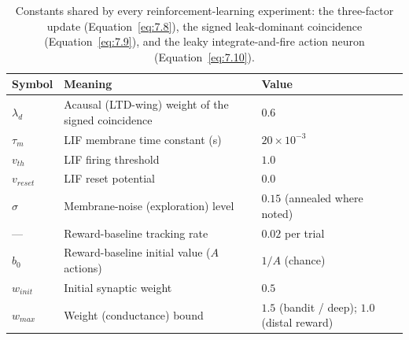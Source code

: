 \begin{table}[htbp!]
    \caption[Shared learning-rule and neuron constants.]{Constants shared by every
    reinforcement-learning experiment: the three-factor update (Equation~\ref{eq:7.8}),
    the signed leak-dominant coincidence (Equation~\ref{eq:7.9}), and the leaky
    integrate-and-fire action neuron (Equation~\ref{eq:7.10}).}
    \begin{center}
    \small
    \begin{tabularx}{\textwidth}{@{}l X l@{}}
    \toprule
    Symbol & Meaning & Value \\
    \midrule
    $\lambda_d$      & Acausal (LTD-wing) weight of the signed coincidence   & $0.6$ \\
    $\tau_m$         & LIF membrane time constant (s)                        & $20\times10^{-3}$ \\
    $v_{th}$         & LIF firing threshold                                  & $1.0$ \\
    $v_{reset}$      & LIF reset potential                                   & $0.0$ \\
    $\sigma$         & Membrane-noise (exploration) level                    & $0.15$ (annealed where noted) \\
    ---              & Reward-baseline tracking rate                         & $0.02$ per trial \\
    $b_0$            & Reward-baseline initial value ($A$ actions)           & $1/A$ (chance) \\
    $w_{init}$       & Initial synaptic weight                               & $0.5$ \\
    $w_{max}$        & Weight (conductance) bound                            & $1.5$ (bandit / deep); $1.0$ (distal reward) \\
    \bottomrule
    \end{tabularx}
    \label{table:A2}
    \end{center}
    \vspace*{-\baselineskip}
\end{table}

